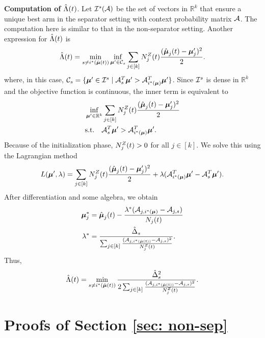         \textbf{Computation of $\hat{\Lambda}(t)$}.         
        Let $\mathcal{I}^s(\mathcal{A})$ be the set of vectors in $\mathbb{R}^k$ that ensure a unique best arm in the separator setting with context probability matrix $\mathcal{A}$. The computation here is similar to that in the non-separator setting. Another expression for $\hat{\Lambda}(t)$ is  
            \begin{align*}
                 \hat{\Lambda}(t) = \min_{s \neq  i^*(\hat{\boldsymbol{\mu}}(t))} \inf_{\boldsymbol{\mu}' \in \mathcal{C}_s} \sum_{j \in [k]} N^{Z}_{j}(t) \frac{(\hat{\boldsymbol{\mu}}_{j}(t) - \boldsymbol{\mu}'_{j})^2}{2}.
            \end{align*}
            where, in this case, $\mathcal{C}_s = \{\boldsymbol{\mu}' \in \mathcal{I}^s \mid \mathcal{A}_s^T \boldsymbol{\mu}' > \mathcal{A}_{i^*(\boldsymbol{\mu})}^T \boldsymbol{\mu}' \}$. Since $\mathcal{I}^s$ is dense in $\mathbb{R}^{k}$ and the objective function is continuous, the 
            inner term is equivalent to       
            \begin{align*}
                &\inf_{\boldsymbol{\mu}' \in \mathbb{R}^{k}} \sum_{j \in [k]} N^{Z}_{j}(t) \frac{(\hat{\boldsymbol{\mu}}_{j}(t) - \boldsymbol{\mu}'_{j})^2}{2} \\
                & \text{s.t.} \quad \mathcal{A}_s^T \boldsymbol{\mu}' > \mathcal{A}_{i^*(\boldsymbol{\mu})}^T \boldsymbol{\mu}'.
            \end{align*}
            Because of the initialization phase, $N^{Z}_{j}(t) > 0$ for all $j \in [k]$. We solve this using the Lagrangian method 
            \begin{equation*}
                   L(\boldsymbol{\mu}', \lambda) = \sum_{j \in [k]} N^{Z}_{j}(t) \frac{(\hat{\boldsymbol{\mu}}_{j}(t) - \boldsymbol{\mu}'_{j})^2}{2} + \lambda(\mathcal{A}_{i^*(\boldsymbol{\mu})}^T \boldsymbol{\mu}' - \mathcal{A}_s^T \boldsymbol{\mu}').
            \end{equation*}
            After differentiation and some algebra, we obtain  
            \begin{align*}
                \boldsymbol{\mu}^{*}_{j} &= \hat{\boldsymbol{\mu}}_{j}(t) -  \frac{\lambda^*(\mathcal{A}_{j, i^*(\boldsymbol{\mu})} - \mathcal{A}_{j, s})}{N_j(t)}               \\
                \lambda^* &= \frac{\hat{\Delta}_{s}}{\sum_{j \in [k]} \frac{(\mathcal{A}_{j, i^*(\hat{\boldsymbol{\mu}}(t))} - \mathcal{A}_{j, s})^2}{N^{Z}_{j}(t)}}.                            
             \end{align*}
             Thus,
             \begin{align*}
                 \hat{\Lambda}(t) = \min_{s \neq  i^*(\hat{\boldsymbol{\mu}}(t))} \frac{\hat{\Delta}^2_{s}}{2\sum_{j \in [k]} \frac{(\mathcal{A}_{j, i^*(\hat{\boldsymbol{\mu}}(t))} - \mathcal{A}_{j, s})^2}{N^{Z}_{j}(t)}}.
             \end{align*}   

\section{Proofs of Section \ref{sec: non-sep}} \label{apd: non-sep proofs}

